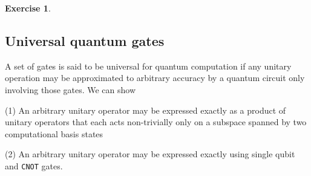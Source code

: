 \documentclass[11pt]{article}
\newcommand\0{\mathbf{0}}
\newcommand\<{\langle}
\renewcommand\>{\rangle}
\renewcommand\phi{\varphi}
\newtheorem{exercise}[theorem]{Exercise}
\begin{document}
%
%
%
%
%
%
%
%


\begin{exercise}
	
\end{exercise}

\subsection{Universal quantum gates}

A set of gates is said to be universal for quantum computation if any unitary operation may be approximated to arbitrary accuracy by a quantum circuit only involving those gates. We can show

(1) An arbitrary unitary operator may be expressed exactly as a product of unitary operators that each acts non-trivially only on a subspace spanned by two computational basis states

(2) An arbitrary unitary operator may be expressed exactly using single qubit and \texttt{CNOT} gates.
\end{document}

